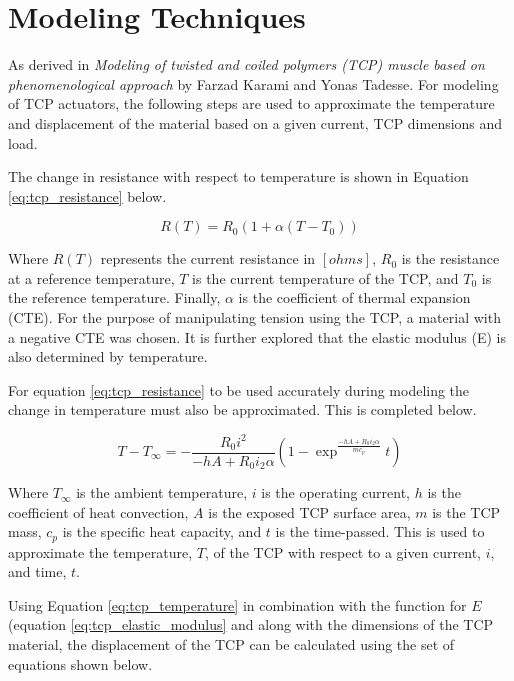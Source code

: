 \section{Modeling Techniques}
\label{sect:modeling_techniques}
	
	As derived in \textit{Modeling of twisted and coiled polymers (TCP) muscle based on phenomenological approach} by Farzad Karami and Yonas Tadesse. For modeling of TCP actuators, the following steps are used to approximate the temperature and displacement of the material based on a given current, TCP dimensions and load.

	The change in resistance with respect to temperature is shown in Equation \ref{eq:tcp_resistance} below.
	
	\begin{equation}
	\label{eq:tcp_resistance}
		R(T) = R_{0} (1 + \alpha (T - T_{0}))
	\end{equation}
	
	Where $R(T)$ represents the current resistance in $[ohms]$, $R_{0}$ is the resistance at a reference temperature, $T$ is the current temperature of the TCP, and $T_{0}$ is the reference temperature. Finally, $\alpha$ is the coefficient of thermal expansion (CTE). For the purpose of manipulating tension using the TCP, a material with a negative CTE was chosen. It is further explored that the elastic modulus (E) is also determined by temperature.
	
	For equation \ref{eq:tcp_resistance} to be used accurately during modeling the change in temperature must also be approximated. This is completed below.
	
	\begin{equation}
	\label{eq:tcp_temperature}
		T - T_{\infty} =
			- \frac{R_{0} i^{2}}{-h A + R_{0} i_{2} \alpha}
			\left(
				1 -
				\exp^{\frac{-h A + R_{0} i_{2} \alpha}{m c_{p}}} t
			\right)
	\end{equation}
	
	Where $T_{\infty}$ is the ambient temperature, $i$ is the operating current, $h$ is the coefficient of heat convection, $A$ is the exposed TCP surface area, $m$ is the TCP mass, $c_{p}$ is the specific heat capacity, and $t$ is the time-passed. This is used to approximate the temperature, $T$, of the TCP with respect to a given current, $i$, and time, $t$.
	
	Using Equation \ref{eq:tcp_temperature} in combination with the function for $E$ (equation \ref{eq:tcp_elastic_modulus} and along with the dimensions of the TCP material, the displacement of the TCP can be calculated using the set of equations shown below.
	
